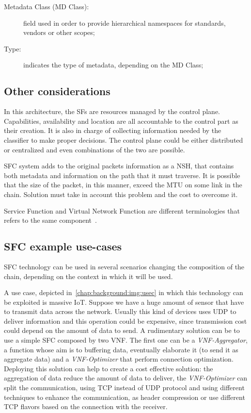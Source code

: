 \begin{description}
  \item[Metadata Class (MD Class):] field used in order to provide hierarchical
  namespaces for standards, vendors or other scopes;
  \item[Type:] indicates the type of metadata, depending on the MD Class;
\end{description}

\subsection{Other considerations}
In this architecture, the SFs are resources managed by the control
plane. Capabilities, availability and location are all accountable to the
control part as their creation. It is also in charge of collecting information
needed by the classifier to make proper decisions. The control plane could be
either distributed or centralized and even combinations of the two are
possible.

SFC system adds to the original packets information as a NSH, that contains both
metadata and information on the path that it must traverse. It is possible that
the size of the packet, in this manner, exceed the MTU on some link in the
chain. Solution must take in account this problem and the cost to overcome it.

Service Function and Virtual Network Function are different terminologies that
refers to the same component~\cite{medhat2017service}.

\subsection{SFC example use-cases}
SFC technology can be used in several scenarios changing the composition of the
chain, depending on the context in which it will be used.

A use case, depicted in~\ref{chap:background:img:usec} in which this technology can be exploited is massive
IoT. Suppose we
have a huge amount of sensor that have to transmit data across the network.
Usually this kind of devices uses UDP to deliver information and this
operation could be expensive, since transmission cost could depend on the amount
of data to send. A rudimentary solution can be to use a simple SFC composed by
two VNF. The first one can be a \emph{VNF-Aggregator}, a function whose aim is
to buffering data, eventually elaborate it (to send it as aggregate data) and a
\emph{VNF-Optimizer} that perform connection optimization. Deploying this
solution can help to create a cost effective solution: the aggregation of data
reduce the amount of data to deliver, the \emph{VNF-Optimizer} can split the
communication, using TCP instead of UDP protocol and using different techniques
to enhance the communication, as header compression or use different TCP
flavors based on the connection with the receiver.


